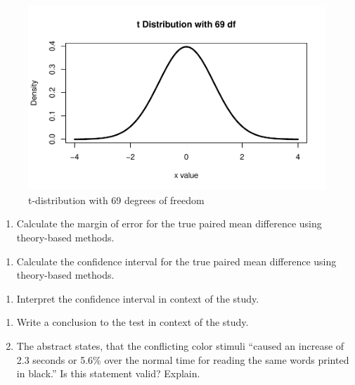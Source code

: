 \documentclass[
]{report}
\providecommand{\tightlist}{%
  \setlength{\itemsep}{0pt}\setlength{\parskip}{0pt}}
\begin{document}
\begin{figure}

{\centering \includegraphics[width=0.7\linewidth]{11-A23-paired-theory_files/figure-latex/tstar-1} 

}

\caption{t-distribution with 69 degrees of freedom}\label{fig:tstar}
\end{figure}

\begin{enumerate}
\def\labelenumi{\arabic{enumi}.}
\setcounter{enumi}{11}
\tightlist
\item
  Calculate the margin of error for the true paired mean difference using theory-based methods.
\end{enumerate}

\vspace{0.6in}

\begin{enumerate}
\def\labelenumi{\arabic{enumi}.}
\setcounter{enumi}{12}
\tightlist
\item
  Calculate the confidence interval for the true paired mean difference using theory-based methods.
\end{enumerate}

\vspace{0.6in}

\begin{enumerate}
\def\labelenumi{\arabic{enumi}.}
\setcounter{enumi}{13}
\tightlist
\item
  Interpret the confidence interval in context of the study.
\end{enumerate}

\vspace{1in}

\begin{enumerate}
\def\labelenumi{\arabic{enumi}.}
\setcounter{enumi}{14}
\item
  Write a conclusion to the test in context of the study.
  \vspace{0.6in}
\item
  The abstract states, that the conflicting color stimuli ``caused an increase of 2.3 seconds or 5.6\% over the normal time for reading the same words printed in black.'' Is this statement valid? Explain.
  \vspace{0.6in}
\end{enumerate}
\end{document}
